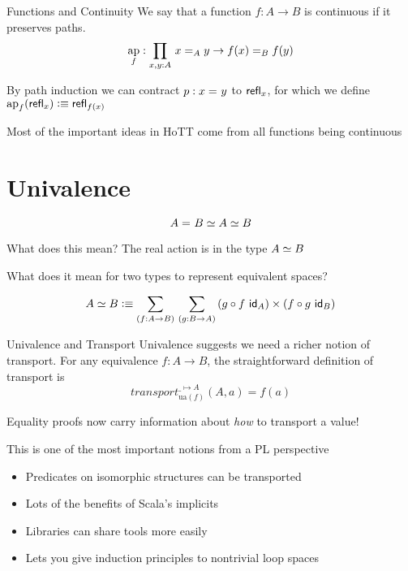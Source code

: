 \documentclass[xcolor=svgnames]{beamer}
\DeclareMathOperator{\apf}{ap}
\begin{document}
\begin{frame}{Functions and Continuity}
  We say that a function $f : A \to B$ is continuous if it preserves paths.
  $$ \apf_f : \prd{x,y:A} x =_A y \to f(x) =_B f(y) $$

  By path induction we can contract $p : x =_{} y$ to $\mathsf{refl}_{x}$, for which we define
  $\apf_f(\refl{x}) \defeq \refl{f(x)}$ \pause

  Most of the important ideas in HoTT come from all functions being continuous
\end{frame}

\section{Univalence}

\begin{frame}
  \begin{center}
  \end{center}
\end{frame}

\begin{frame}
   $$ A =_{} B \simeq A \simeq B $$

  What does this mean? \pause
   The real action is in the type $A \simeq B$

   What does it mean for two types to represent equivalent spaces? \pause
   
   $$
   \eqv{A}{B} \defeq \sm{f : A \to B}{g : B \to A}
   (g \circ f ~ \idfunc[A]) \times (f \circ g ~ \idfunc[B])
   $$
\end{frame}

\begin{frame}{Univalence and Transport}
  Univalence suggests we need a richer notion of transport. For any equivalence
  $f : A \to B$, the straightforward definition of transport is
  $$ transport^{\_ \mapsto A}_{\mathrm{ua}(f)}(A,a) = f(a) $$

  Equality proofs now carry information about \emph{how} to transport a value! \pause

  This is one of the most important notions from a PL perspective
  \begin{itemize}
  \item Predicates on isomorphic structures can be transported
  \item Lots of the benefits of Scala's implicits
  \item Libraries can share tools more easily
  \item Lets you give induction principles to nontrivial loop spaces
  \end{itemize}
\end{frame}
\end{document}

